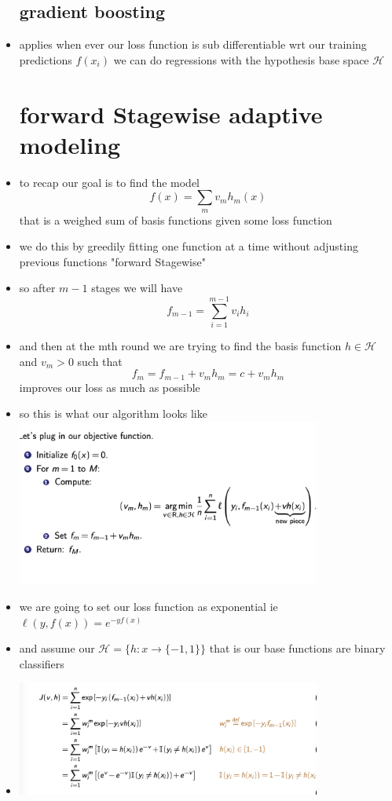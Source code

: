 \documentclass{article}
\begin{document}
\begin{itemize}
\subsection*{gradient boosting }
\item applies when ever our loss function is sub differentiable wrt our training predictions $f(x_i)$ we can do regressions with the hypothesis base space $\mathcal{H}$
\section*{forward Stagewise adaptive modeling}
\item to recap our goal is to find the model $$f(x)=\sum_{m}v_mh_m(x)$$ that is a weighed sum of basis functions given some loss function
\item we do this by greedily fitting one function at a time without adjusting previous functions "forward Stagewise"
\item so after $m-1$ stages we will have $$f_{m-1}=\sum_{i=1}^{m-1}v_ih_i$$
\item and then at the mth round we are trying to find the basis function $h\in \mathcal{H}$ and $v_m>0$ such that $$f_m=f_{m-1}+v_mh_m=c+v_mh_m$$ improves our loss as much as possible 
\item so this is what our algorithm looks like \\ \includegraphics*[width=10cm]{images/Screenshot 2023-05-14 at 10.18.27 PM.png}
\item we are going to set our loss function as exponential ie $\ell(y,f(x))=e^{-yf(x)}$
\item and assume our $\mathcal{H}=\{h:x\rightarrow \{-1,1\}\}$ that is our base functions are binary classifiers
\item   \includegraphics*[width=10cm]{images/Screenshot 2023-05-14 at 10.26.42 PM.png}

\end{itemize}
\end{document}
